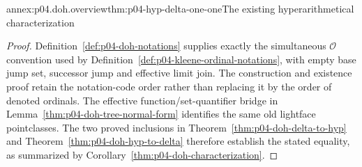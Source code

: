 \begin{annexitem}{annex:p04.doh.overview}{thm:p04-hyp-delta-one-one}{The existing hyperarithmetical characterization}
\begin{proof}
Definition~\ref{def:p04-doh-notations} supplies exactly the simultaneous
\(\mathcal O\) convention used by
Definition~\ref{def:p04-kleene-ordinal-notations}, with empty base jump set,
successor jump and effective limit join. The construction and existence
proof retain the notation-code order rather than replacing it by the order
of denoted ordinals. The effective function/set-quantifier bridge in
Lemma~\ref{thm:p04-doh-tree-normal-form} identifies the same old lightface
pointclasses. The two proved inclusions in
Theorem~\ref{thm:p04-doh-delta-to-hyp} and
Theorem~\ref{thm:p04-doh-hyp-to-delta} therefore establish the stated
equality, as summarized by Corollary~\ref{thm:p04-doh-characterization}.
\end{proof}
\end{annexitem}
